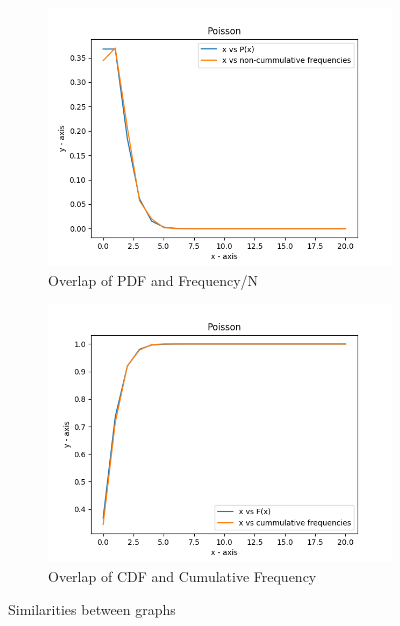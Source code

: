 \documentclass[12pt]{article}
\begin{document}
\begin{figure}[H]
	\centering
	\begin{subfigure}{.5\textwidth}
		\centering
		\includegraphics[scale=0.56]{Figures/pdf_noncum.png}
		\caption{Overlap of PDF and Frequency/N}
		\label{fig:fx}
	\end{subfigure}%
	\begin{subfigure}{.5\textwidth}
		\centering
		\includegraphics[scale=0.56]{Figures/cdf_cumfreq.png}
		\caption{Overlap of CDF and Cumulative Frequency}
		\label{fig:cumfreq}
	\end{subfigure}
	\caption{Similarities between graphs}
	\label{fig:overlap}
\end{figure}
\end{document}
